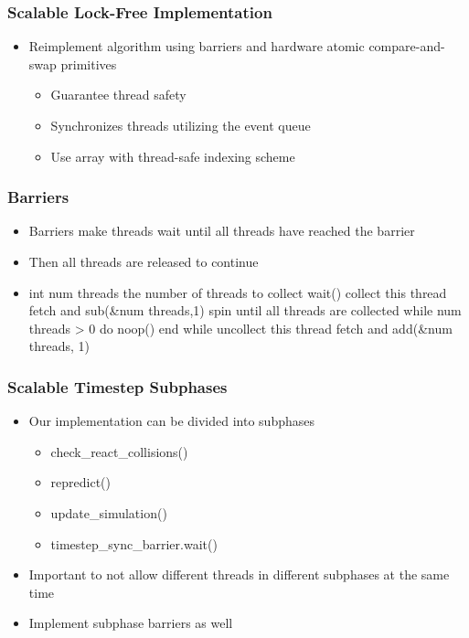 \documentclass{beamer}
\begin{document}
\begin{frame}
	\frametitle{Scalable Lock-Free Implementation}
	\begin{itemize}
		\item Reimplement algorithm using barriers and hardware atomic compare-and-swap primitives
		\begin{itemize}
			\item Guarantee thread safety
			\item Synchronizes threads utilizing the event queue
			\item Use array with thread-safe indexing scheme
		\end{itemize}
	\end{itemize}
\end{frame}

\begin{frame}
	\frametitle{Barriers}
	\begin{itemize}
		\item Barriers make threads wait until all threads have reached the barrier
		\item Then all threads are released to continue
		\item
int num threads {the number of threads to collect}
wait()
{collect this thread}
fetch and sub(&num threads,1)
{spin until all threads are collected}
while num threads > 0 do
  noop()
end while
{uncollect this thread}
fetch and add(&num threads, 1)
	\end{itemize}
\end{frame}

\begin{frame}
	\frametitle{Scalable Timestep Subphases}
	\begin{itemize}
		\item Our implementation can be divided into subphases
		\begin{itemize}
			\item check\_react\_collisions()
			\item repredict()
			\item update\_simulation()
			\item timestep\_sync\_barrier.wait()
		\end{itemize}
		\item Important to not allow different threads in different subphases at the same time
		\item Implement subphase barriers as well
	\end{itemize}
\end{frame}
\end{document}
